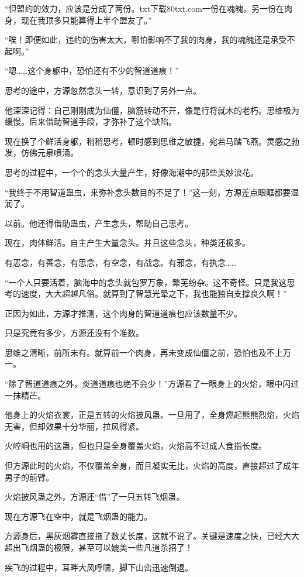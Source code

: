 \begin{this_body}
“但盟约的效力，应该是分成了两份。txt下载80txt.com一份在魂魄。另一份在肉身，现在我顶多只能算得上半个盟友了。”

“唉！即便如此，违约的伤害太大，哪怕影响不了我的肉身，我的魂魄还是承受不起啊。”

“嗯……这个身躯中，恐怕还有不少的智道道痕！”

思考的途中，方源忽然念头一转，意识到了另外一点。

他深深记得：自己刚刚成为仙僵，脑筋转动不开，像是行将就木的老朽。思维极为缓慢。后来借助智道手段，才弥补了这个缺陷。

现在换了个鲜活身躯，稍稍思考，顿时感到思维之敏捷，宛若马踏飞燕。灵感之勃发，仿佛元泉喷涌。

思考的过程中，一个个的念头大量产生，好像海潮中的那些美妙浪花。

“我终于不用智道蛊虫，来弥补念头数目的不足了！”这一刻，方源差点眼眶都要湿润了。

以前。他还得借助蛊虫，产生念头，帮助自己思考。

现在，肉体鲜活。自主产生大量念头。并且这些念头，种类还极多。

有恶念，有善念，有思念，有空念，有战念。有邪念，有执念……

“一个人只要活着，脑海中的念头就包罗万象，繁芜纷杂。这不奇怪。只是我这思考的速度，大大超越凡俗。就算到了智慧光晕之下，我也能独自支撑良久啊！”

正因为如此，方源才推测，这个肉身的智道道痕也应该数量不少。

只是究竟有多少，方源还没有个准数。

思维之清晰，前所未有。就算前一个肉身，再未变成仙僵之前，恐怕也及不上万一。

“除了智道道痕之外，炎道道痕也绝不会少！”方源看了一眼身上的火焰，眼中闪过一抹精芒。

他身上的火焰衣裳，正是五转的火焰披风蛊。一旦用了，全身燃起熊熊烈焰，火焰无害，但却效果十分华丽，拉风得紧。

火崆峒也用的这蛊，但也只是全身覆盖火焰，火焰高不过成人食指长度。

但方源此时的火焰，不仅覆盖全身，而且凝实无比，火焰的高度，直接超过了成年男子的前臂。

火焰披风蛊之外，方源还“借”了一只五转飞烟蛊。

现在方源飞在空中，就是飞烟蛊的能力。

方源身后，黑灰烟雾直接拖了数丈长度，这就不说了。关键是速度之快，已经大大超出飞烟蛊的极限，甚至可以媲美一些凡道杀招了！

疾飞的过程中，耳畔大风呼啸，脚下山峦迅速倒退。


\end{this_body}
